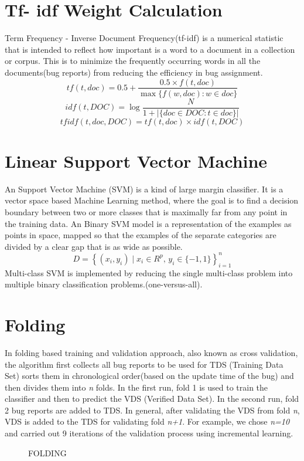 \section{Tf- idf Weight Calculation}
 Term Frequency - Inverse Document Frequency(tf-idf) is a numerical statistic that is intended to reflect how important is a word to a document in a collection or corpus. This is to minimize the frequently occurring words in all the documents(bug reports) from reducing the efficiency in bug assignment. 
\[{tf(t,doc) = 0.5 + \frac{0.5 \times f(t, doc)}{\max\{f(w, doc):w \in doc\}} }\] 
\[{ idf(t, DOC) = \log \frac{N}{1+|\{doc \in DOC: t \in doc\}|}  }\]
\[{ tfidf(t,doc,DOC) = tf(t,doc) \times idf(t, DOC)  }\]

\section{Linear Support Vector Machine}
An Support Vector Machine (SVM) is a kind of large margin classifier. It is a vector space based Machine Learning method, where the goal is to find a decision boundary between two or more classes that is maximally far from any point in the training data. An Binary SVM model is a representation of the examples as points in space, mapped so that the examples of the separate categories are divided by a clear gap that is as wide as possible.
\[{D = \left\{ (x_i, y_i)\mid x_i \in {R}^p,\, y_i \in \{ -1,1\}\right\}_{i=1}^n}\]
Multi-class SVM is implemented by reducing the single multi-class problem into multiple binary classification problems.(one-versus-all).

\section{Folding}
In folding based training and validation approach, also known as cross validation, the algorithm first collects all bug reports to be used for TDS (Training Data Set) sorts them in chronological order(based on the update time of the bug) and then divides them into \textit{n} folds. In the first run, fold 1 is used to train the classifier and then to predict the VDS (Verified Data Set). In the second run, fold 2 bug reports are added to TDS. In general, after validating the VDS from fold \textit{n}, VDS is added to the TDS for validating fold \textit{n+1}. For example, we chose \textit{n=10} and carried out 9 iterations of the validation process using incremental learning.
\newpage
\begin{figure}[hbt]
\begin{center}

\caption{FOLDING}
\end{center}
\end{figure}
\newpage

